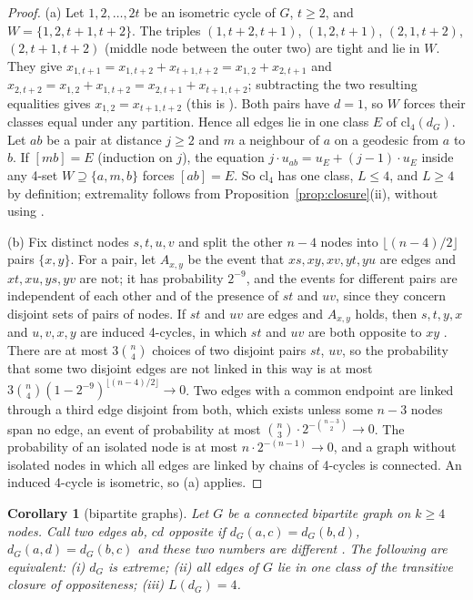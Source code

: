 \documentclass[11pt,a4paper]{article}
\newtheorem*{corollary}{Corollary}
\theoremstyle{definition}
\theoremstyle{remark}
\newcommand{\cl}{\mathrm{cl}}
\begin{document}
\begin{proof}
(a) Let $1, 2, \dots, 2t$ be an isometric cycle of $G$, $t \ge 2$, and $W = \{1, 2, t + 1, t + 2\}$. The triples
$(1, t + 2, t + 1)$, $(1, 2, t + 1)$, $(2, 1, t + 2)$, $(2, t + 1, t + 2)$ (middle node between the outer two) are
tight and lie in $W$. They give $x_{1,t+1} = x_{1,t+2} + x_{t+1,t+2} = x_{1,2} + x_{2,t+1}$ and
$x_{2,t+2} = x_{1,2} + x_{1,t+2} = x_{2,t+1} + x_{t+1,t+2}$; subtracting the two resulting equalities gives
$x_{1,2} = x_{t+1,t+2}$ (this is \cite[Lemma 2.3]{A80}). Both pairs have $d = 1$, so $W$ forces their classes equal
under any partition. Hence all edges lie in one class $E$ of $\cl_4(d_G)$. Let $ab$ be a pair at distance $j \ge 2$
and $m$ a neighbour of $a$ on a geodesic from $a$ to $b$. If $[mb] = E$ (induction on $j$), the equation
$j\cdot u_{ab} = u_E + (j - 1)\cdot u_E$ inside any 4-set $W \supseteq \{a, m, b\}$ forces $[ab] = E$. So $\cl_4$ has
one class, $L \le 4$, and $L \ge 4$ by definition; extremality follows from Proposition~\ref{prop:closure}(ii),
without using \cite[Thm 2.4]{A80}.

(b) Fix distinct nodes $s, t, u, v$ and split the other $n - 4$ nodes into $\lfloor (n - 4)/2 \rfloor$ pairs
$\{x, y\}$. For a pair, let $A_{x,y}$ be the event that $xs, xy, xv, yt, yu$ are edges and $xt, xu, ys, yv$ are not;
it has probability $2^{-9}$, and the events for different pairs are independent of each other and of the presence of
$st$ and $uv$, since they concern disjoint sets of pairs of nodes. If $st$ and $uv$ are edges and $A_{x,y}$ holds,
then $s, t, y, x$ and $u, v, x, y$ are induced 4-cycles, in which $st$ and $uv$ are both opposite to $xy$
\cite[Fig.~3.5]{A80}. There are at most $3\binom n4$ choices of two disjoint pairs $st$, $uv$, so the probability
that some two disjoint edges are not linked in this way is at most
$3\binom n4 (1 - 2^{-9})^{\lfloor (n-4)/2 \rfloor} \to 0$. Two edges with a common endpoint are linked through a
third edge disjoint from both, which exists unless some $n - 3$ nodes span no edge, an event of probability at most
$\binom n3\cdot 2^{-\binom{n-3}{2}} \to 0$. The probability of an isolated node is at most $n\cdot 2^{-(n-1)} \to 0$,
and a graph without isolated nodes in which all edges are linked by chains of 4-cycles is connected. An induced
4-cycle is isometric, so (a) applies.
\end{proof}

\begin{corollary}[bipartite graphs]
Let $G$ be a connected bipartite graph on $k \ge 4$ nodes. Call two edges $ab$, $cd$ \emph{opposite} if
$d_G(a, c) = d_G(b, d)$, $d_G(a, d) = d_G(b, c)$ and these two numbers are different \cite[Prop.~4]{LS93}. The
following are equivalent: \textup{(i)} $d_G$ is extreme; \textup{(ii)} all edges of $G$ lie in one class of the
transitive closure of oppositeness; \textup{(iii)} $L(d_G) = 4$.
\end{corollary}
\end{document}
